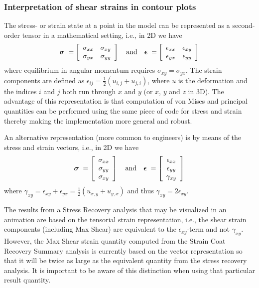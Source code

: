 \subsubsection{Interpretation of shear strains in contour plots}

The stress- or strain state at a point in the model can be represented as
a second-order tensor in a mathematical setting, i.e., in 2D we have
$$
\mbox{\boldmath$\sigma$} \;= \left[
  \begin{array}{cc}
    \sigma_{xx} & \sigma_{xy} \\
    \sigma_{yx} & \sigma_{yy}
  \end{array}
  \right] \quad\text{and}\quad
\mbox{\boldmath$\epsilon$} \;= \left[
  \begin{array}{cc}
    \epsilon_{xx} & \epsilon_{xy} \\
    \epsilon_{yx} & \epsilon_{yy}
  \end{array}\right]
$$
where equilibrium in angular momentum requires $\sigma_{xy}=\sigma_{yx}$.
The strain components are defined as $\epsilon_{ij}=\frac{1}{2}(u_{i,j}+u_{j,i})$,
where $u$ is the deformation and the indices $i$ and $j$ both run through
$x$ and $y$ (or $x$, $y$ and $z$ in 3D). The advantage of this representation
is that computation of von Mises and principal quantities can be performed using
the same piece of code for stress and strain thereby making the implementation
more general and robust.

An alternative representation (more common to engineers) is by means of
the stress and strain vectors, i.e., in 2D we have
$$
\mbox{\boldmath$\sigma$} \;= \left[
  \begin{array}{c}
    \sigma_{xx} \\
    \sigma_{yy} \\
    \sigma_{xy}
  \end{array}
  \right] \quad\mbox{and}\quad
\mbox{\boldmath$\epsilon$} \;= \left[
  \begin{array}{c}
    \epsilon_{xx} \\
    \epsilon_{yy} \\
    \gamma_{xy}
  \end{array}
  \right]
$$
where $\gamma_{xy}=\epsilon_{xy}+\epsilon_{yx}=\frac{1}{2}(u_{x,y}+ u_{y,x})$
and thus $\gamma_{xy}=2\epsilon_{xy}$.

The results from a Stress Recovery analysis that may be visualized in an
animation are based on the tensorial strain representation, i.e.,
the shear strain components (including Max Shear) are equivalent to the
$\epsilon_{xy}$-term and not $\gamma_{xy}$. However, the Max Shear strain
quantity computed from the Strain Coat Recovery Summary analysis is currently
based on the vector representation so that it will be twice as large as the
equivalent quantity from the stress recovery analysis. It is important to be
aware of this distinction when using that particular result quantity.

